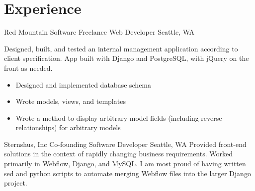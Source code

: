 \documentclass[10pt,a4paper,sans]{moderncv}        %
\begin{document}
\section{Experience}

\begin{comment}
  \cventry
  {date - date}
  {Employer}
  {Job Title}
  {}
  {City, State}
  {Description of work
    \begin{itemize}
    \item specific achievement
    \item specific achievement
    \end{itemize}}
\end{comment}

 {Red Mountain Software} {Freelance Web Developer} {} {Seattle, WA} {Designed, built, and tested an internal management application according to client specification. App built with Django and PostgreSQL, with jQuery on the front as needed.
  \begin{itemize}
  \item Designed and implemented database schema
  \item Wrote models, views, and templates
  \item Wrote a method to display arbitrary model fields (including reverse relationships) for arbitrary models
  \end{itemize}}

 {Sternshus, Inc} {Co-founding Software Developer} {} {Seattle, WA} {Provided front-end solutions in the context of rapidly changing business requirements. Worked primarily in Webflow, Django, and MySQL. I am most proud of having written sed and python scripts to automate merging Webflow files into the larger Django project.}

\begin{comment}
\cventry {2012.04 - 2015.04} {Cleanscapes} {AR Specialist} {} {Seattle, WA} {
  \begin{itemize}
  \item Wrote and maintained a library of accurate, sophisticated SQL queries to capture evolving data inconsistencies; these queries eliminated 37.5 labor hours per month despite at 126\% increase in customer accounts over a two year period
  \item Designed database reports for internal and external customers, such as government officials and senior management
  \item Delegated data entry and data revision tasks
  \item Collaborated with operations, data quality, payment processing, and customer service teams to analyze and improve processes as new city contracts were won
  \end{itemize}}
\end{comment}
\end{document}
